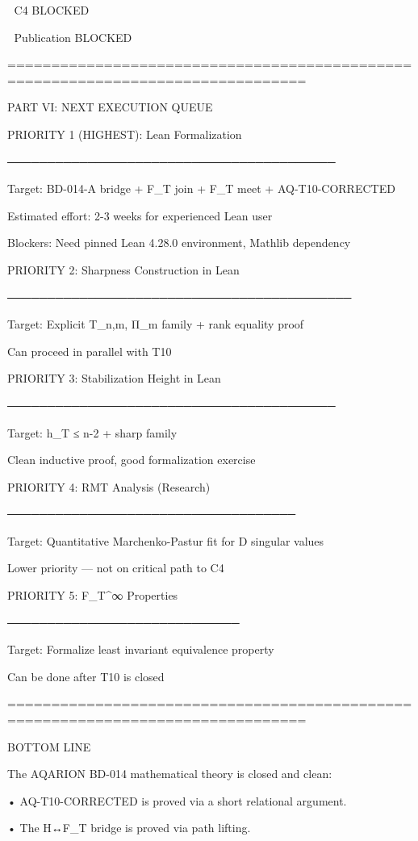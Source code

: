 🔴 C4                             BLOCKED

🔴 Publication                    BLOCKED


================================================================================

PART VI: NEXT EXECUTION QUEUE


PRIORITY 1 (HIGHEST): Lean Formalization

─────────────────────────────────────────

Target: BD-014-A bridge + F_T join + F_T meet + AQ-T10-CORRECTED

Estimated effort: 2-3 weeks for experienced Lean user

Blockers: Need pinned Lean 4.28.0 environment, Mathlib dependency


PRIORITY 2: Sharpness Construction in Lean

───────────────────────────────────────────

Target: Explicit T_{n,m}, Π_m family + rank equality proof

Can proceed in parallel with T10


PRIORITY 3: Stabilization Height in Lean

─────────────────────────────────────────

Target: h_T ≤ n-2 + sharp family

Clean inductive proof, good formalization exercise


PRIORITY 4: RMT Analysis (Research)

────────────────────────────────────

Target: Quantitative Marchenko-Pastur fit for D singular values

Lower priority — not on critical path to C4


PRIORITY 5: F_T^∞ Properties

─────────────────────────────

Target: Formalize least invariant equivalence property

Can be done after T10 is closed


================================================================================

BOTTOM LINE


The AQARION BD-014 mathematical theory is closed and clean:


• AQ-T10-CORRECTED is proved via a short relational argument.

• The H↔F_T bridge is proved via path lifting.


